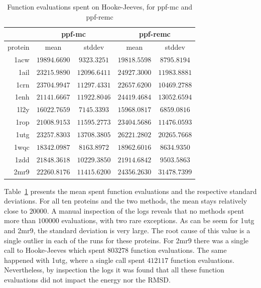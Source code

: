 \begin{table}
  \centering
  \begin{tabular}{r|c|c||c|c}
            & \multicolumn{2}{c}{ppf-mc} & \multicolumn{2}{||c}{ppf-remc} \\ \hline
    protein & mean         & stddev       & mean         & stddev \\ \hline \hline
    1acw    & $19894.6690$ & $9323.3251$  & $19818.5598$ & $8795.8194$  \\ \hline
    1ail    & $23215.9890$ & $12096.6411$ & $24927.3000$ & $11983.8881$ \\ \hline
    1crn    & $23704.9947$ & $11297.4331$ & $22657.6200$ & $10469.2788$ \\ \hline
    1enh    & $21141.6667$ & $11922.8046$ & $24419.4684$ & $13052.6594$ \\ \hline
    1l2y    & $16022.7659$ & $7145.3393$  & $15968.0817$ & $6859.0816$  \\ \hline
    1rop    & $21008.9153$ & $11595.2773$ & $23404.5686$ & $11476.0593$ \\ \hline
    1utg    & $23257.8303$ & $13708.3805$ & $26221.2802$ & $20265.7668$ \\ \hline
    1wqc    & $18342.0987$ & $8163.8972$  & $18962.6016$ & $8634.9350$  \\ \hline
    1zdd    & $21848.3618$ & $10229.3850$ & $21914.6842$ & $9503.5863$  \\ \hline
    2mr9    & $22260.8176$ & $11415.6200$ & $24356.2630$ & $31478.7399$ \\ \hline
  \end{tabular}
  \caption{Function evaluations spent on Hooke-Jeeves, for ppf-mc and ppf-remc}
  \label{tab:spent-evals}
\end{table}

Table~\ref{tab:spent-evals} presents the mean spent function evaluations and
the respective standard deviations. For all ten proteins and the two methods,
the mean stays relatively close to $20000$. A manual inspection of the logs
reveals that no methods spent more than $100000$ evaluations, with two rare
exceptions. As can be seem for 1utg and 2mr9, the standard deviation is very
large. The root cause of this value is a single outlier in each of the runs
for these proteins. For 2mr9 there was a single call to Hooke-Jeeves which spent
$803278$ function evaluations. The same happened with 1utg, where a single call
spent $412117$ function evaluations. Nevertheless, by inspection the logs it
was found that all these function evaluations did not impact the energy nor the
RMSD. %

